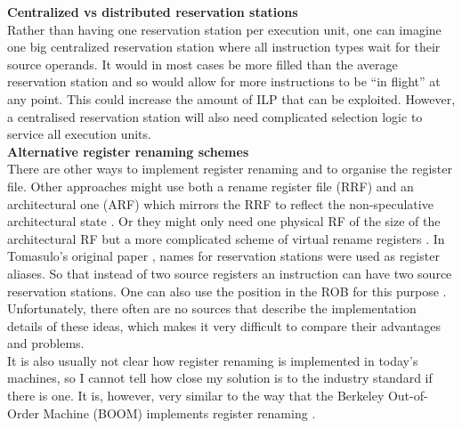 \documentclass[12pt,a4paper]{article} %
\begin{document}
\textbf{Centralized vs distributed reservation stations}\\
	Rather than having one reservation station per execution unit, one can imagine one big centralized reservation station where all instruction types wait for their source operands. It would in most cases be more filled than the average reservation station and so would allow for more instructions to be ``in flight'' at any point. This could increase the amount of ILP that can be exploited. However, a centralised reservation station will also need complicated selection logic to service all execution units. \cite[p.~201-203]{lipastiShen}\\


\textbf{Alternative register renaming schemes}\\
	There are other ways to implement register renaming and to organise the register file. Other approaches might use both a rename register file (RRF) and an architectural one (ARF) which mirrors the RRF to reflect the non-speculative architectural state \cite[p.~239]{lipastiShen}. Or they might only need one physical RF of the size of the architectural RF but a more complicated scheme of virtual rename registers \cite{virtualRR}. In Tomasulo's original paper \cite{tomasulo}, names for reservation stations were used as register aliases. So that instead of two source registers an instruction can have two source reservation stations. One can also use the position in the ROB for this purpose \cite[186f]{Hennessy}. Unfortunately, there often are no sources that describe the implementation details of these ideas, which makes it very difficult to compare their advantages and problems. \\
	It is also usually not clear how register renaming is implemented in today's machines, so I cannot tell how close my solution is to the industry standard if there is one. It is, however, very similar to the way that the Berkeley Out-of-Order Machine (BOOM) implements register renaming \cite[p.~25]{boom}.\\
	
\end{document}
